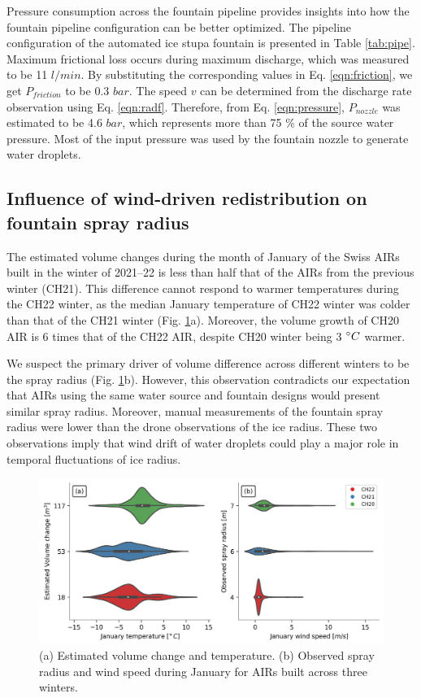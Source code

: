 \documentclass[tc, manuscript]{copernicus}
\begin{document}
Pressure consumption across the fountain pipeline provides insights into how the fountain pipeline configuration
can be better optimized. The pipeline configuration of the automated ice stupa fountain is presented in Table
\ref{tab:pipe}. Maximum frictional loss occurs during maximum discharge, which was measured to be 11 $l/min$. By
substituting the corresponding values in Eq. \ref{eqn:friction}, we get $P_{friction}$ to be 0.3 $bar$. The
speed $v$ can be determined from the discharge rate observation using Eq. \ref{eqn:radf}. Therefore, from Eq.
\ref{eqn:pressure}, $P_{nozzle}$ was estimated to be 4.6 $bar$, which represents more than 75 \% of the source water
pressure. Most of the input pressure was used by the fountain nozzle to generate water droplets.

\subsection{Influence of wind-driven redistribution on fountain spray radius}

The estimated volume changes during the month of January of the Swiss AIRs built in the winter of 2021--22 is less
than half that of the AIRs from the previous winter (CH21). This difference cannot respond to warmer
temperatures during the CH22 winter, as the median January temperature of CH22 winter was colder than that of the
CH21 winter (Fig. \ref{fig:CH_diffs}a). Moreover, the volume growth of CH20 AIR is 6 times that of the CH22 AIR,
despite CH20 winter being 3 $^{\circ} C$ warmer.

We suspect the primary driver of volume difference across different winters to be the spray radius (Fig.
\ref{fig:CH_diffs}b). However, this observation contradicts our expectation that AIRs using the same water
source and fountain designs would present similar spray radius. Moreover, manual measurements of the fountain
spray radius were lower than the drone observations of the ice radius. These two observations imply that wind
drift of water droplets could play a major role in temporal fluctuations of ice radius.

\begin{figure}[htb]
\includegraphics[width=\textwidth]{Figures/CH_diffs.jpg}

\caption{(a) Estimated volume change and temperature. (b) Observed spray radius and wind speed
during January for AIRs built across three winters. } 

\label{fig:CH_diffs} 
\end{figure}
\end{document}

